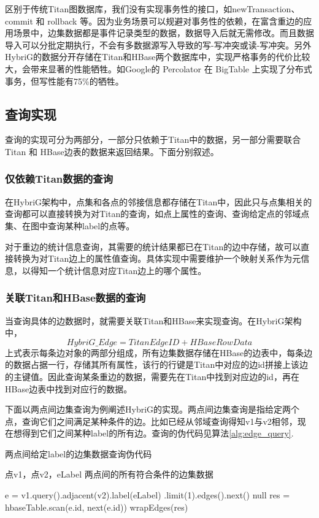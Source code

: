 区别于传统Titan图数据库，我们没有实现事务性的接口，如newTransaction、 commit 和 rollback 等。因为业务场景可以规避对事务性的依赖，在富含重边的应用场景中，边集数据都是事件记录类型的数据，数据导入后就无需修改。而且数据导入可以分批定期执行，不会有多数据源写入导致的写-写冲突或读-写冲突。另外HybriG的数据分开存储在Titan和HBase两个数据库中，实现严格事务的代价比较大，会带来显著的性能牺牲。如Google的 Percolator\supercite{percolator} 在 BigTable 上实现了分布式事务，但写性能有75\%的牺牲。

\subsection{查询实现}
查询的实现可分为两部分，一部分只依赖于Titan中的数据，另一部分需要联合Titan 和 HBase边表的数据来返回结果。下面分别叙述。
\subsubsection{仅依赖Titan数据的查询}
在HybriG架构中，点集和各点的邻接信息都存储在Titan中，因此只与点集相关的查询都可以直接转换为对Titan的查询，如点上属性的查询、查询给定点的邻域点集、在图中查询某种label的点等。

对于重边的统计信息查询，其需要的统计结果都已在Titan的边中存储，故可以直接转换为对Titan边上的属性值查询。具体实现中需要维护一个映射关系作为元信息，以得知一个统计信息对应Titan边上的哪个属性。
\subsubsection{关联Titan和HBase数据的查询}
当查询具体的边数据时，就需要关联Titan和HBase来实现查询。在HybriG架构中，
$$HybriG\_Edge = TitanEdgeID + HBaseRowData$$
上式表示每条边对象的两部分组成，所有边集数据存储在HBase的边表中，每条边的数据占据一行，存储其所有属性，该行的行键是Titan中对应的边id拼接上该边的主键值。因此查询某条重边的数据，需要先在Titan中找到对应边的id，再在HBase边表中找到对应行的数据。

下面以两点间边集查询为例阐述HybriG的实现。两点间边集查询是指给定两个点，查询它们之间满足某种条件的边。比如已经从邻域查询得知v1与v2相邻，现在想得到它们之间某种label的所有边。查询的伪代码见算法\ref{alg:edge_query}.
\begin{algorithm}
\caption{两点间给定label的边集数据查询伪代码}
\label{alg:edge_query}
\begin{algorithmic}[1] %
\REQUIRE 点v1，点v2，eLabel
\ENSURE 两点间的所有符合条件的边集数据

\STATE e = v1.query().adjacent(v2).label(eLabel)
.limit(1).edges().next()
\RETURN null
\ENDIF
\STATE res = hbaseTable.scan(e.id, next(e.id))
\RETURN wrapEdges(res)
\end{algorithmic}
\end{algorithm}

